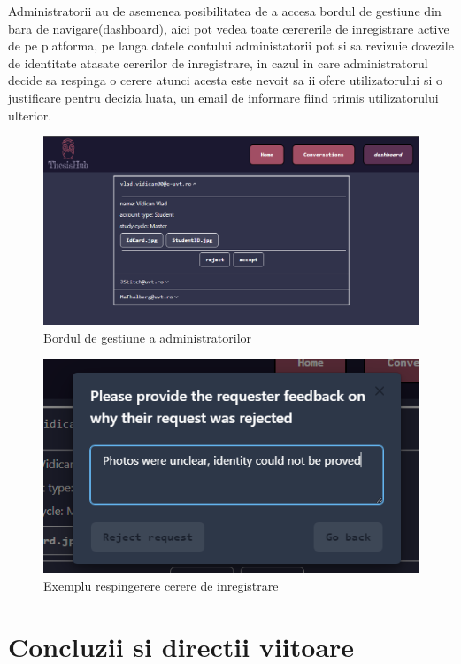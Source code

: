 \documentclass[12pt,a4paper,hidelinks]{report}
\theoremstyle{definition}
\theoremstyle{remark}
\begin{document}
Administratorii au de asemenea posibilitatea de a accesa bordul de gestiune din bara de navigare(dashboard), 
aici pot vedea toate cerererile de inregistrare active de pe platforma, pe langa datele contului 
administatorii pot si sa revizuie dovezile de identitate atasate cererilor de inregistrare,
in cazul in care administratorul decide sa respinga o cerere atunci acesta este nevoit sa ii ofere utilizatorului si o justificare 
pentru decizia luata, un email de informare fiind trimis utilizatorului ulterior.
\begin{figure}[H]
    \centering
    \includegraphics[scale=0.5]{images/Dashboard.PNG}
    \caption{Bordul de gestiune a administratorilor}
\end{figure}
\begin{figure}[H]
    \centering
    \includegraphics[scale=0.7]{images/RejectRequest.PNG}
    \caption{Exemplu respingerere cerere de inregistrare}
\end{figure}
\chapter{Concluzii si directii viitoare}
\end{document}
